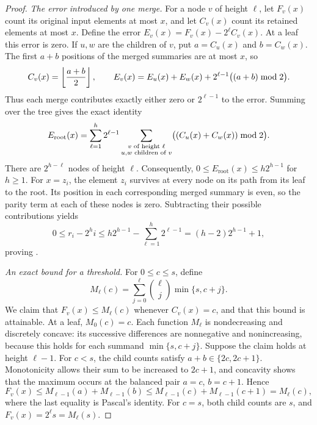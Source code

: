 \begin{proof}
    \emph{The error introduced by one merge.}
    For a node $v$ of height $\ell$, let $F_v(x)$ count its original
    input elements at most $x$, and let $C_v(x)$ count its retained
    elements at most $x$. Define the error
    $E_v(x)=F_v(x)-2^\ell C_v(x)$. At a leaf this error is zero.
    If $u,w$ are the children of $v$, put $a=C_u(x)$ and $b=C_w(x)$.
    The first $a+b$ positions of the merged summaries are at most $x$,
    so
    \begin{equation*}
        C_v(x)=\left\lfloor {\frac{a+b}{2}} \right\rfloor,
        \qquad
        E_v(x)=E_u(x)+E_w(x)
             +2^{\ell-1}\bigl((a+b)\bmod 2\bigr).
    \end{equation*}
    Thus each merge contributes exactly either zero or $2^{\ell-1}$
    to the error. Summing over the tree gives the exact identity
    \begin{equation}
        \eqlab{thinning:error:sum}
        E_{\mathrm{root}}(x)
        =\sum_{\ell=1}^{h}2^{\ell-1}
          \sum_{\substack{v\text{ of height }\ell\\
                          u,w\text{ children of }v}}
          \bigl((C_u(x)+C_w(x))\bmod 2\bigr).
    \end{equation}
    There are $2^{h-\ell}$ nodes of height $\ell$. Consequently,
    $0\leq E_{\mathrm{root}}(x)\leq h2^{h-1}$ for $h\geq1$.
    For $x=z_i$, the element $z_i$ survives at every node on its path
    from its leaf to the root. Its position in each corresponding
    merged summary is even, so the parity term at each of these
    nodes is zero. Subtracting their possible contributions yields
    \begin{equation*}
        0\leq r_i-2^h i
        \leq h2^{h-1}-\sum_{\ell=1}^{h}2^{\ell-1}
        =(h-2)2^{h-1}+1,
    \end{equation*}
    proving .

    \smallskip\noindent\emph{An exact bound for a threshold.}
    For $0\leq c\leq s$, define
    \begin{equation*}
        M_\ell(c)=\sum_{j=0}^{\ell}\binom{\ell}{j}\min\{s,c+j\}.
    \end{equation*}
    We claim that $F_v(x)\leq M_\ell(c)$ whenever $C_v(x)=c$,
    and that this bound is attainable. At a leaf, $M_0(c)=c$.
    Each function $M_\ell$ is nondecreasing and discretely concave:
    its successive differences are nonnegative and nonincreasing,
    because this holds for each summand $\min\{s,c+j\}$.
    Suppose the claim holds at height $\ell-1$. For $c<s$, the child
    counts satisfy $a+b\in\{2c,2c+1\}$. Monotonicity allows their
    sum to be increased to $2c+1$, and concavity shows that the
    maximum occurs at the balanced pair $a=c$, $b=c+1$. Hence
    \begin{equation*}
        F_v(x)\leq M_{\ell-1}(a)+M_{\ell-1}(b)
        \leq M_{\ell-1}(c)+M_{\ell-1}(c+1)=M_\ell(c),
    \end{equation*}
    where the last equality is Pascal's identity. For $c=s$, both
    child counts are $s$, and $F_v(x)=2^\ell s=M_\ell(s)$.


\end{proof}
